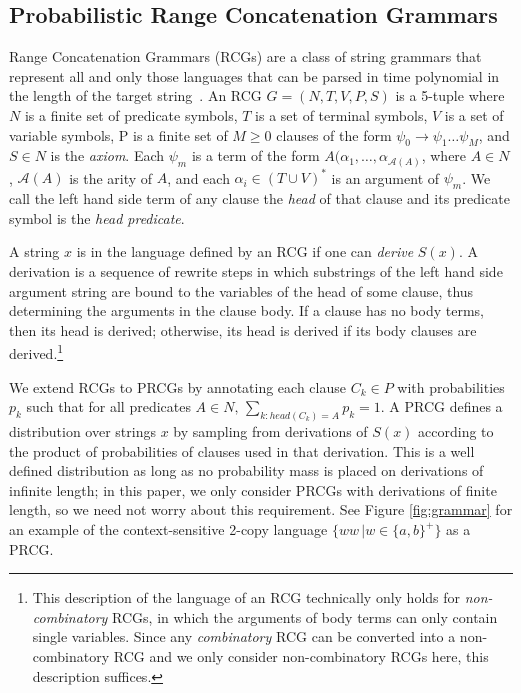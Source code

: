 \documentclass{article} %
\begin{document}
\subsection{Probabilistic Range Concatenation Grammars}
Range Concatenation Grammars (RCGs) are a class of string grammars
that represent all and only those languages that can be parsed in time
polynomial in the length of the target
string~\cite{boullier2005range}. An RCG $G=(N, T, V, P, S)$ is a
5-tuple where $N$ is a finite set of predicate symbols, $T$ is a set
of terminal symbols, $V$ is a set of variable symbols, P is a finite
set of $M \geq 0$ clauses of the form $\psi_0 \rightarrow \psi_1 \dots
\psi_M$, and $S \in N$ is the \emph{axiom}. Each $\psi_m$ is a term of
the form $A(\alpha_1, \dots, \alpha_{\mathcal{A}(A)}$, where $A \in
N$, $\mathcal{A}(A)$ is the arity of $A$, and each $\alpha_i \in (T
\cup V)^*$ is an argument of $\psi_m$. We call the left hand side term
of any clause the \emph{head} of that clause and its predicate symbol
is the \emph{head predicate}.

A string $x$ is in the language defined by an RCG if one can
\emph{derive} $S(x)$. A derivation is a sequence of rewrite steps in
which substrings of the left hand side argument string are bound to
the variables of the head of some clause, thus determining the
arguments in the clause body. If a clause has no body terms, then its
head is derived; otherwise, its head is derived if its body clauses
are derived.\footnote{This description of the language of an RCG
  technically only holds for \emph{non-combinatory} RCGs, in which the
  arguments of body terms can only contain single variables. Since any
  \emph{combinatory} RCG can be converted into a non-combinatory RCG
  and we only consider non-combinatory RCGs here, this description
  suffices.}

We extend RCGs to PRCGs by annotating each clause $C_k \in P$ with
probabilities $p_k$ such that for all predicates ${A \in N, \,
  \sum_{k:head(C_k)=A} p_k = 1}$. A PRCG defines a distribution over
strings $x$ by sampling from derivations of $S(x)$ according to the
product of probabilities of clauses used in that derivation. This is a
well defined distribution as long as no probability mass is placed on
derivations of infinite length; in this paper, we only consider PRCGs
with derivations of finite length, so we need not worry about this
requirement. See Figure \ref{fig:grammar} for an example of the context-sensitive 2-copy language $\{ww\,|w \in \{a,b\}^+\}$ as a PRCG.
\end{document}
